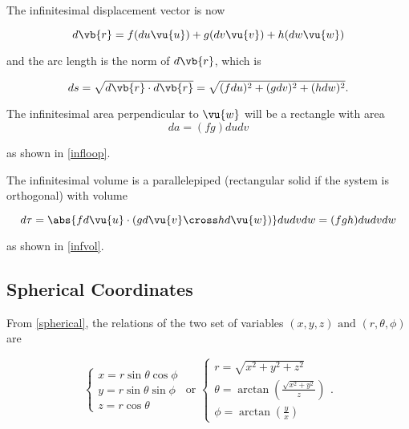 \documentclass[english,a4paper,12pt]{report}
\begin{document}
The infinitesimal displacement vector is now 

\begin{equation}
    d \vb{r} = f(du\vu{u}) + g(dv\vu{v}) + h(dw\vu{w}) \label{dl} 
\end{equation}

and the arc length is the norm of \(d \vb{r} \), which is 

\begin{equation}
    ds = \sqrt{d \vb{r} \cdot d \vb{r} } = \sqrt{(fdu)^2 + (gdv)^2 + (hdw)^2}.  
\end{equation}



The infinitesimal area perpendicular to \(\vu{w}\) will be a rectangle with area
\begin{equation}
	da = (fg)dudv \label{da}
\end{equation} 

as shown in \cref{infloop}.

	
The infinitesimal volume is a parallelepiped (rectangular solid if the system is orthogonal) with volume

\begin{equation}
    d \tau = \abs{fd \vu{u} \cdot (gd \vu{v} \cross hd \vu{w} )}dudvdw = (fgh)dudvdw 
\end{equation}

as shown in \cref{infvol}. 

	
\subsection{Spherical Coordinates}


From \cref{spherical}, the relations of the two set of variables \((x,y,z) \text { and } (r,\theta ,\phi  )\)  are

\begin{equation}
    \begin{cases} x = r\sin \theta \cos \phi \\ y = r\sin \theta \sin \phi \\ z = r\cos \theta \end{cases} \text { or } \begin{cases} r = \sqrt{x^2+y^2+z^2} \\ \displaystyle \theta = \arctan {\left(\frac{\sqrt{x^2+y^2} }{z} \right)} \\ \displaystyle \phi = \arctan {\left(\frac{y}{x}\right)} \end{cases}. 
\end{equation}
\end{document}
